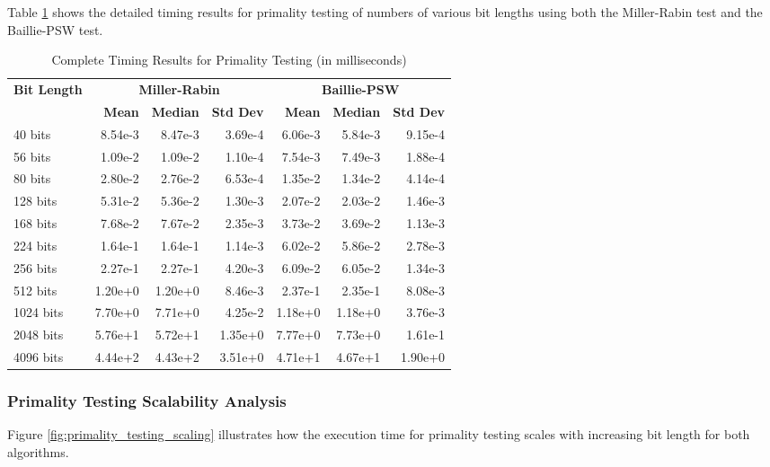 Table \ref{tab:primality_complete} shows the detailed timing results for primality testing of numbers of various bit lengths using both the Miller-Rabin test and the Baillie-PSW test.

\begin{table}[H]
\centering
\caption{Complete Timing Results for Primality Testing (in milliseconds)}
\label{tab:primality_complete}
\begin{tabular}{@{}lrrrrrr@{}}
\toprule
\multirow{2}{*}{\textbf{Bit Length}} & \multicolumn{3}{c}{\textbf{Miller-Rabin}} & \multicolumn{3}{c}{\textbf{Baillie-PSW}} \\
\cmidrule(lr){2-4} \cmidrule(lr){5-7}
& \textbf{Mean} & \textbf{Median} & \textbf{Std Dev} & \textbf{Mean} & \textbf{Median} & \textbf{Std Dev} \\
\midrule
40 bits     & 8.54e-3 & 8.47e-3 & 3.69e-4 & 6.06e-3 & 5.84e-3 & 9.15e-4 \\
56 bits     & 1.09e-2 & 1.09e-2 & 1.10e-4 & 7.54e-3 & 7.49e-3 & 1.88e-4 \\
80 bits     & 2.80e-2 & 2.76e-2 & 6.53e-4 & 1.35e-2 & 1.34e-2 & 4.14e-4 \\
128 bits    & 5.31e-2 & 5.36e-2 & 1.30e-3 & 2.07e-2 & 2.03e-2 & 1.46e-3 \\
168 bits    & 7.68e-2 & 7.67e-2 & 2.35e-3 & 3.73e-2 & 3.69e-2 & 1.13e-3 \\
224 bits    & 1.64e-1 & 1.64e-1 & 1.14e-3 & 6.02e-2 & 5.86e-2 & 2.78e-3 \\
256 bits    & 2.27e-1 & 2.27e-1 & 4.20e-3 & 6.09e-2 & 6.05e-2 & 1.34e-3 \\
512 bits    & 1.20e+0 & 1.20e+0 & 8.46e-3 & 2.37e-1 & 2.35e-1 & 8.08e-3 \\
1024 bits   & 7.70e+0 & 7.71e+0 & 4.25e-2 & 1.18e+0 & 1.18e+0 & 3.76e-3 \\
2048 bits   & 5.76e+1 & 5.72e+1 & 1.35e+0 & 7.77e+0 & 7.73e+0 & 1.61e-1 \\
4096 bits   & 4.44e+2 & 4.43e+2 & 3.51e+0 & 4.71e+1 & 4.67e+1 & 1.90e+0 \\
\bottomrule
\end{tabular}
\end{table}

\subsubsection{Primality Testing Scalability Analysis}

Figure \ref{fig:primality_testing_scaling} illustrates how the execution time for primality testing scales with increasing bit length for both algorithms.

